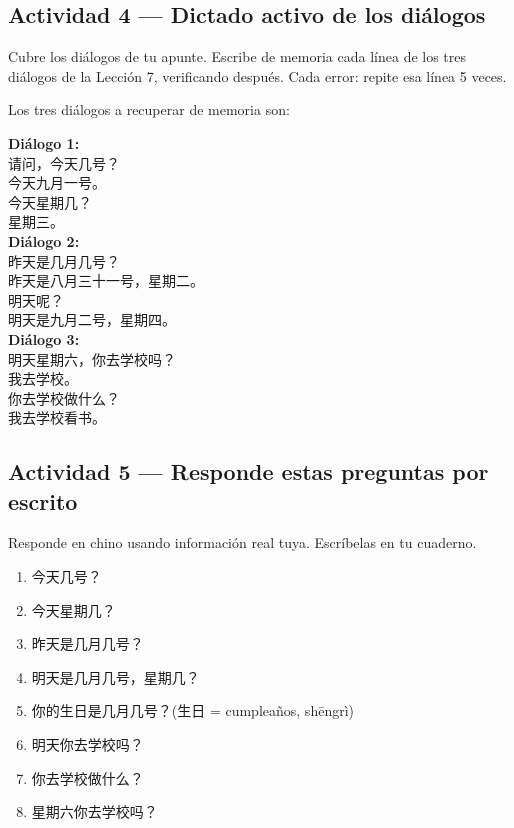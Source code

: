 \documentclass[12pt, a4paper]{article}
\begin{document}
\subsection{Actividad 4 — Dictado activo de los diálogos}

Cubre los diálogos de tu apunte. Escribe de memoria cada línea de los tres diálogos de la Lección 7, verificando después. Cada error: repite esa línea 5 veces.

Los tres diálogos a recuperar de memoria son:

\begin{cuadrogris}
\textbf{Diálogo 1:}\\
请问，今天几号？\\
今天九月一号。\\
今天星期几？\\
星期三。\\[6pt]
\textbf{Diálogo 2:}\\
昨天是几月几号？\\
昨天是八月三十一号，星期二。\\
明天呢？\\
明天是九月二号，星期四。\\[6pt]
\textbf{Diálogo 3:}\\
明天星期六，你去学校吗？\\
我去学校。\\
你去学校做什么？\\
我去学校看书。
\end{cuadrogris}

\subsection{Actividad 5 — Responde estas preguntas por escrito}

Responde en chino usando información real tuya. Escríbelas en tu cuaderno.

\begin{enumerate}[leftmargin=1.5cm]
\item 今天几号？
\item 今天星期几？
\item 昨天是几月几号？
\item 明天是几月几号，星期几？
\item 你的生日是几月几号？\quad (生日 = cumpleaños, shēngrì)
\item 明天你去学校吗？
\item 你去学校做什么？
\item 星期六你去学校吗？
\end{enumerate}
\end{document}
